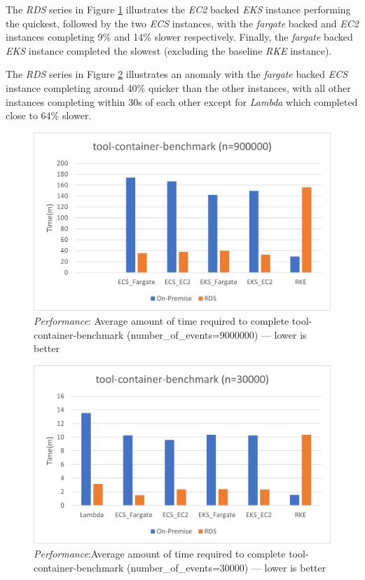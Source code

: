 The \textit{RDS} series in Figure \ref{fig:perf_tcb_default} illustrates the \textit{EC2} backed \textit{EKS} instance performing the quickest,
followed by the two \textit{ECS} instances, with the \textit{fargate} backed and \textit{EC2} instances completing 9\% and 14\% slower respectively.
Finally, the \textit{fargate} backed \textit{EKS} instance completed the slowest (excluding the baseline \textit{RKE} instance).

The \textit{RDS} series in Figure \ref{fig:perf_tcb_30000} illustrates an anomaly with the \textit{fargate} backed \textit{ECS}
instance completing around 40\% quicker than the other instances, with all other instances completing within 30s of each other
except for \textit{Lambda} which completed close to 64\% slower.

\begin{figure}[htbp]
  \includegraphics[width=\textwidth]{images/perf-tcb_default.png}
  \caption{\emph{Performance}: Average amount of time required to complete tool-container-benchmark (number\_of\_events=9000000) --- lower is better}
  \label{fig:perf_tcb_default}
\end{figure}

\begin{figure}[htbp]
  \includegraphics[width=\textwidth]{images/perf-tcb_30000.png}
  \caption{\emph{Performance}:Average amount of time required to complete tool-container-benchmark (number\_of\_events=30000) --- lower is better}
  \label{fig:perf_tcb_30000}
\end{figure}

